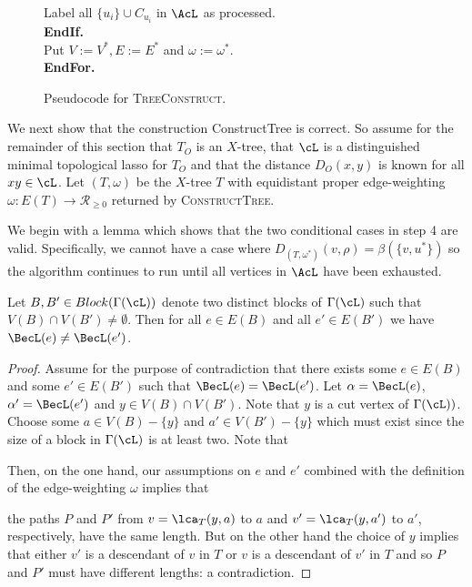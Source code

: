 \begin{figure}
{\begin{tabbing}
 \> \> \> Label all $\{u_i\} \cup C_{u_i}$ in $\AcL$ as processed.\\

 \> \> \textbf{EndIf.}\\

 \> \> Put $V:=V^*, E:=E^*$ and $\omega:=\omega^*$.\\

 \> \textbf{EndFor.}

         \end{tabbing}}
\caption{Pseudocode for \textsc{TreeConstruct}.}
\label{algorithm:treeconstruct2}
\end{figure}

We next show that the construction ConstructTree is correct.  So assume for
the remainder of this section that $T_O$ is an $X$-tree, that $\cL$ is a
distinguished minimal topological lasso for $T_O$ and that the distance $D_O(x,y)$
is known for all $xy \in \cL$.  Let $(T,\omega)$ be the $X$-tree $T$ with
equidistant proper edge-weighting $\omega \colon E(T) \to
\mathcal{R}_{\geq 0}$ returned by \textsc{ConstructTree}.

We begin with a lemma which shows that the two conditional cases in step 4 are
valid.  Specifically, we cannot have a case where
$D_{(T,\omega^*)}(v,\rho) = \beta(\{v,u^*\})$ so the algorithm continues to
run until all vertices in $\AcL$ have been exhausted.

\begin{lem}
  \label{lem:nonequal-adjacent}
  Let $B,B' \in Block(\Gamma(\cL))$ denote two distinct blocks of
  $\Gamma(\cL)$ such that $V(B) \cap V(B') \neq \emptyset$.  Then for all $e
  \in E(B)$ and all $e' \in E(B')$ we have $\BecL(e) \neq \BecL(e')$.
\end{lem}

\begin{proof}
  Assume for the purpose of contradiction that there exists some $e \in E(B)$
  and some $e' \in E(B')$ such that $\BecL(e) = \BecL(e')$.  Let $\alpha =
  \BecL(e)$, $\alpha' = \BecL(e')$ and $y \in V(B) \cap V(B')$.  Note that $y$
  is a cut vertex of $\Gamma(\cL))$.  Choose some $a \in V(B) - \{y\}$ and $a'
  \in V(B') - \{y\}$ which must exist since the size of a block in
  $\Gamma(\cL)$ is at least two.  Note that 

  Then, on the one hand, our assumptions on
  $e$ and $e'$ combined with the definition of the edge-weighting $\omega$
  implies that

  the paths $P$ and $P'$ from $v = \lca_{T}(y,a)$ to $a$ and $v'
  = \lca_{T}(y,a')$ to $a'$, respectively, have the same length.  But on the
  other hand the choice of $y$ implies that either $v'$ is a descendant of $v$
  in $T$ or $v$ is a descendant of $v'$ in $T$ and so $P$ and $P'$ must have
  different lengths: a contradiction.
\end{proof}

